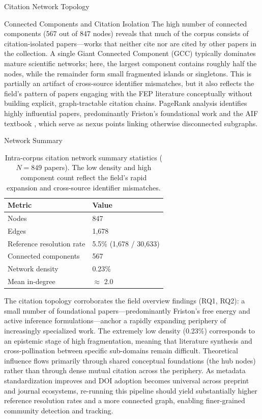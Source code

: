 \documentclass[
  ignorenonframetext,
]{beamer}
\begin{document}
\begin{frame}{Citation Network Topology \label{sec:citation_network}}
\begin{block}{Connected Components and Citation Isolation}
\protect{}\label{connected-components-and-citation-isolation}
The high number of connected components (567 out of 847 nodes) reveals
that much of the corpus consists of citation-isolated papers---works
that neither cite nor are cited by other papers in the collection. A
single Giant Connected Component (GCC) typically dominates mature
scientific networks; here, the largest component contains roughly half
the nodes, while the remainder form small fragmented islands or
singletons. This is partially an artifact of cross-source identifier
mismatches, but it also reflects the field's pattern of papers engaging
with the FEP literature conceptually without building explicit,
graph-tractable citation chains. PageRank analysis identifies highly
influential papers, predominantly Friston's foundational work
\citep{friston2010free} and the AIF textbook \citep{parr2022active},
which serve as nexus points linking otherwise disconnected subgraphs.
\end{block}

\begin{block}{Network Summary}
\protect{}\label{network-summary}
\begin{table}[htbp]
\centering
\caption{Intra-corpus citation network summary statistics ($N = 849$ papers). The low density and high component count reflect the field's rapid expansion and cross-source identifier mismatches.}
\label{tab:citation_network}
\begin{tabular}{ll}
\toprule
\textbf{Metric} & \textbf{Value} \\
\midrule
Nodes & 847 \\
Edges & 1,678 \\
Reference resolution rate & 5.5\% (1,678 / 30,633) \\
Connected components & 567 \\
Network density & 0.23\% \\
Mean in-degree & $\approx$ 2.0 \\
\bottomrule
\end{tabular}
\end{table}

The citation topology corroborates the field overview findings (RQ1,
RQ2): a small number of foundational papers---predominantly Friston's
free energy and active inference formulations---anchor a rapidly
expanding periphery of increasingly specialized work. The extremely low
density (0.23\%) corresponds to an epistemic stage of high
fragmentation, meaning that literature synthesis and cross-pollination
between specific sub-domains remain difficult. Theoretical influence
flows primarily through shared conceptual foundations (the hub nodes)
rather than through dense mutual citation across the periphery. As
metadata standardization improves and DOI adoption becomes universal
across preprint and journal ecosystems, re-running this pipeline should
yield substantially higher reference resolution rates and a more
connected graph, enabling finer-grained community detection and
tracking.
\end{block}
\end{frame}
\end{document}
